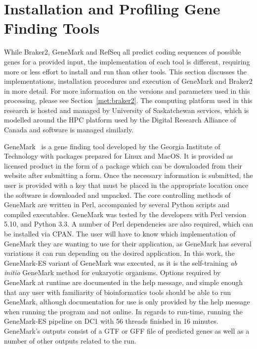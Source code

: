\section{Installation and Profiling Gene Finding Tools}
\label{section:profiling}

While Braker2, GeneMark and RefSeq all predict coding sequences of
possible genes for a provided input, the implementation of each tool
is different, requiring more or less effort to install and run than
other tools. This section discusses the implementations, installation
procedures and execution of GeneMark and Braker2 in more detail. For
more information on the versions and parameters used in this
processing, please see Section~\ref{met:braker2}. The computing
platform used in this research is hosted and managed by University of
Saskatchewan services, which is modelled around the HPC platform used
by the Digital Research Alliance of Canada and software is managed
similarly.

GeneMark~\cite{borodovsky2011a} is a gene finding tool developed by
the Georgia Institute of Technology with packages prepared for Linux
and MacOS. It is provided as licensed product in the form of a package
which can be downloaded from their website after submitting a
form. Once the necessary information is submitted, the user is
provided with a key that must be placed in the appropriate location
once the software is downloaded and unpacked. The core controlling
methods of GeneMark are written in Perl, accompanied by several Python
scripts and compiled executables. GeneMark was tested by the
developers with Perl version 5.10, and Python 3.3. A number of Perl
dependencies are also required, which can be installed via CPAN. The
user will have to know which implementation of GeneMark they are
wanting to use for their application, as GeneMark has several
variations it can run depending on the desired application. In this
work, the GeneMark-ES variant of GeneMark was executed, as it is the
self-training \textit{ab initio} GeneMark method for eukaryotic
organisms. Options required by GeneMark at runtime are documented in
the help message, and simple enough that any user with familiarity of
bioinformatics tools should be able to run GeneMark, although
documentation for use is only provided by the help message when
running the program and not online. In regards to run-time, running
the GeneMark-ES pipeline on DC1 with 56 threads finished in 16
minutes. GeneMark's outputs consist of a GTF or GFF file of predicted
genes as well as a number of other outputs related to the run.

